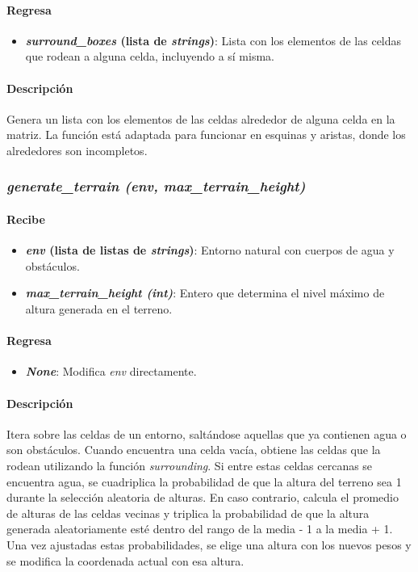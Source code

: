 \documentclass[12pt, letterpaper]{article}
\begin{document}
            \paragraph{Regresa}
                \begin{itemize}
                    \item \textbf{\textit{surround\_boxes} (lista de \textit{strings})}: Lista con los elementos de las celdas que rodean a alguna celda, incluyendo a sí misma.
                \end{itemize}
            \paragraph{Descripción}
                Genera un lista con los elementos de las celdas alrededor de alguna celda en la matriz. La función está adaptada para funcionar en esquinas y aristas, donde los alrededores son incompletos.
        \subsubsection{\textit{generate\_terrain (env, max\_terrain\_height)}}
            \paragraph{Recibe}
                \begin{itemize}
                    \item \textbf{\textit{env} (lista de listas de \textit{strings})}: Entorno natural con cuerpos de agua y obstáculos.
                    \item \textbf{\textit{max\_terrain\_height (int)}}: Entero que determina el nivel máximo de altura generada en el terreno.
                \end{itemize}
            \paragraph{Regresa}
                \begin{itemize}
                    \item \textbf{\textit{None}}: Modifica \textit{env} directamente.
                \end{itemize}
            \paragraph{Descripción}
                Itera sobre las celdas de un entorno, saltándose aquellas que ya contienen agua o son obstáculos. Cuando encuentra una celda vacía, obtiene las celdas que la rodean utilizando la función \textit{surrounding}. Si entre estas celdas cercanas se encuentra agua, se cuadriplica la probabilidad de que la altura del terreno sea 1 durante la selección aleatoria de alturas. En caso contrario, calcula el promedio de alturas de las celdas vecinas y triplica la probabilidad de que la altura generada aleatoriamente esté dentro del rango de la media - 1 a la media + 1. Una vez ajustadas estas probabilidades, se elige una altura con los nuevos pesos y se modifica la coordenada actual con esa altura.
\end{document}

